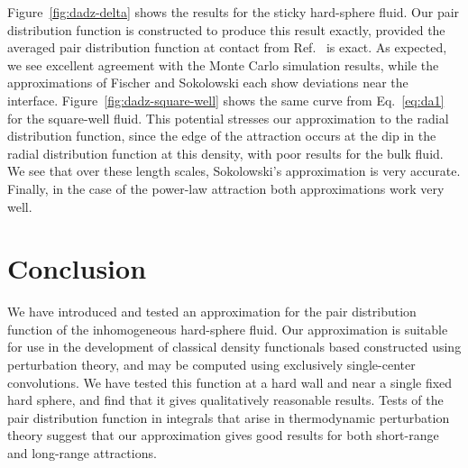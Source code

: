 \documentclass[letterpaper,twocolumn,amsmath,amssymb,pre,aps,10pt]{revtex4-1}
\begin{document}
Figure~\ref{fig:dadz-delta} shows the results for the sticky
hard-sphere fluid.  Our pair distribution function is constructed to
produce this result exactly, provided the averaged pair distribution
function at contact from Ref.~ is exact.  As
expected, we see excellent agreement with the Monte Carlo simulation
results, while the approximations of Fischer and Sokolowski each show
deviations near the interface.  Figure~\ref{fig:dadz-square-well}
shows the same curve from Eq.~\ref{eq:da1} for the square-well fluid.
This potential stresses our approximation to the radial distribution
function, since the edge of the attraction occurs at the dip in the
radial distribution function at this density, with poor results for
the bulk fluid.  We see that over these length scales, Sokolowski's
approximation is very accurate.  Finally, in the case of the power-law
attraction both approximations work very well.

\section{Conclusion}

We have introduced and tested an approximation for the pair
distribution function of the inhomogeneous hard-sphere fluid.  Our
approximation is suitable for use in the development of classical
density functionals based constructed using perturbation theory, and
may be computed using exclusively single-center convolutions.  We have
tested this function at a hard wall and near a single fixed hard
sphere, and find that it gives qualitatively reasonable results.
Tests of the pair distribution function in integrals that arise in
thermodynamic perturbation theory suggest that our approximation gives
good results for both short-range and long-range attractions.

\end{document}
